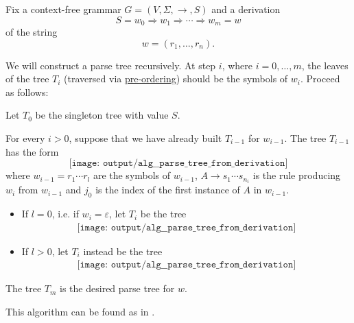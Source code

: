 \begin{algorithm}\label{alg:derivation_to_parse_tree}
  Fix a context-free grammar \( G = (V, \Sigma, \to, S) \) and a derivation
  \begin{equation*}
    S = w_0 \Rightarrow w_1 \Rightarrow \cdots \Rightarrow w_m = w
  \end{equation*}
  of the string
  \begin{equation*}
    w = (r_1, \ldots, r_n).
  \end{equation*}

  We will construct a parse tree recursively. At step \( i \), where \( i = 0, \ldots, m \), the leaves of the tree \( T_i \) (traversed via \hyperref[def:traversal_ordering]{pre-ordering}) should be the symbols of \( w_i \). Proceed as follows:
  \begin{thmenum}
     Let \( T_0 \) be the singleton tree with value \( S \).

     For every \( i > 0 \), suppose that we have already built \( T_{i-1} \) for \( w_{i-1} \). The tree \( T_{i-1} \) has the form
    \begin{equation*}
      \texttt{[image: output/alg\_\_parse\_tree\_from\_derivation]}
    \end{equation*}
    where \( w_{i-1} = r_1 \cdots r_l \) are the symbols of \( w_{i-1} \), \( A \to s_1 \cdots s_{n_i} \) is the rule producing \( w_i \) from \( w_{i-1} \) and \( j_0 \) is the index of the first instance of \( A \) in \( w_{i-1} \).

    \begin{itemize}
      \item If \( l = 0 \), i.e. if \( w_i = \varepsilon \), let \( T_i \) be the tree
      \begin{equation*}
        \begin{aligned}
          \texttt{[image: output/alg\_\_parse\_tree\_from\_derivation]}
        \end{aligned}
      \end{equation*}

      \item If \( l > 0 \), let \( T_i \) instead be the tree
      \begin{equation*}
        \begin{aligned}
          \texttt{[image: output/alg\_\_parse\_tree\_from\_derivation]}
        \end{aligned}
      \end{equation*}
    \end{itemize}
  \end{thmenum}

   The tree \( T_m \) is the desired parse tree for \( w \).
\end{algorithm}
\begin{comments}
  \item This algorithm can be found as  in \cite{code}.
\end{comments}

